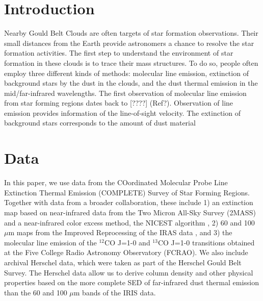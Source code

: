 \documentclass{emulateapj}
\begin{document}



\section{Introduction}
\label{sec:introduction}
Nearby Gould Belt Clouds are often targets of star formation observations. Their small distances from the Earth provide astronomers a chance to resolve the star formation activities. The first step to understand the environment of star formation in these clouds is to trace their mass structures. To do so, people often employ three different kinds of methods: molecular line emission, extinction of background stars by the dust in the clouds, and the dust thermal emission in the mid/far-infrared wavelengths.
The first observation of molecular line emission from star forming regions dates back to [????] (Ref?). Observation of line emission provides information of the line-of-sight velocity.
The extinction of background stars corresponds to the amount of dust material 

\section{Data}
\label{sec:data}
In this paper, we use data from the COordinated Molecular Probe Line Extinction Thermal Emission (COMPLETE) Survey of Star Forming Regions. Together with data from a broader collaboration, these include 1) an extinction map based on near-infrared data from the Two Micron All-Sky Survey (2MASS) and a near-infrared color excess method, the NICEST algorithm \citep[][note that this is an improved version of the NICER algorithm and is developed after the COMPLETE Survey]{Lombardi_2009}, 2) 60 and 100 $\mu$m maps from the Improved Reprocessing of the IRAS data \citep[IRIS;]{Miville_Deschenes_2005}, and 3) the molecular line emission of the $^{12}$CO J=1-0 and $^{13}$CO J=1-0 transitions obtained at the Five College Radio Astronomy Observatory (FCRAO). We also include archival Herschel data, which were taken as part of the Herschel Gould Belt Survey. The Herschel data allow us to derive column density and other physical properties based on the more complete SED of far-infrared dust thermal emission than the 60 and 100 $\mu$m bands of the IRIS data.
\end{document}
